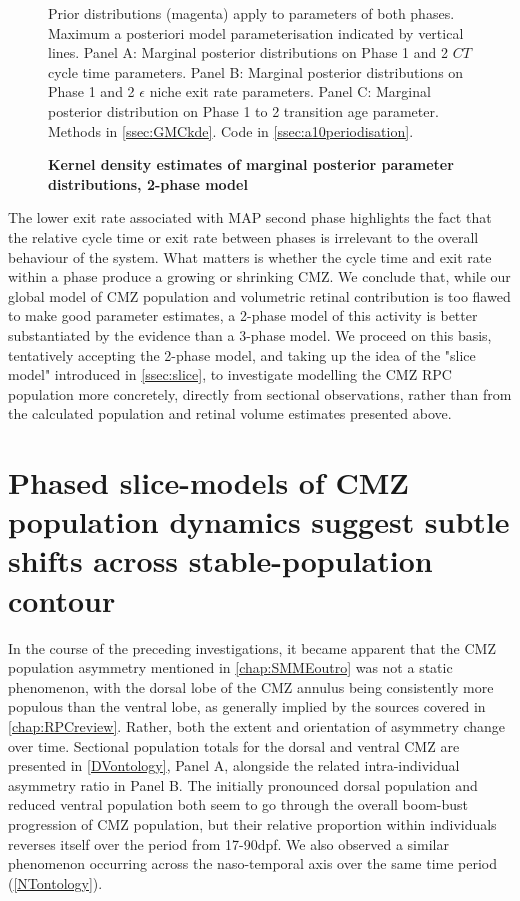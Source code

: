 \begin{figure}[!h]
    \caption{{\bf Kernel density estimates of marginal posterior parameter distributions, 2-phase model}}
    Prior distributions (magenta) apply to parameters of both phases. Maximum a posteriori model parameterisation indicated by vertical lines.
    Panel A: Marginal posterior distributions on Phase 1 and 2 $CT$ cycle time parameters. 
    Panel B: Marginal posterior distributions on Phase 1 and 2 $\epsilon$ niche exit rate parameters.
    Panel C: Marginal posterior distribution on Phase 1 to 2 transition age parameter.
    \label{phasemarginals}
    Methods in \autoref{ssec:GMCkde}.
    Code in \autoref{ssec:a10periodisation}.    
\end{figure}

The lower exit rate associated with MAP second phase highlights the fact that the relative cycle time or exit rate between phases is irrelevant to the overall behaviour of the system. What matters is whether the cycle time and exit rate within a phase produce a growing or shrinking CMZ. We conclude that, while our global model of CMZ population and volumetric retinal contribution is too flawed to make good parameter estimates, a 2-phase model of this activity is better substantiated by the evidence than a 3-phase model. We proceed on this basis, tentatively accepting the 2-phase model, and taking up the idea of the "slice model" introduced in \autoref{ssec:slice}, to investigate modelling the CMZ RPC population more concretely, directly from sectional observations, rather than from the calculated population and retinal volume estimates presented above.

\FloatBarrier

\section{Phased slice-models of CMZ population dynamics suggest subtle shifts across stable-population contour}
\label{sec:sliceGMC}

In the course of the preceding investigations, it became apparent that the CMZ population asymmetry mentioned in \autoref{chap:SMMEoutro} was not a static phenomenon, with the dorsal lobe of the CMZ annulus being consistently more populous than the ventral lobe, as generally implied by the sources covered in \autoref{chap:RPCreview}. Rather, both the extent and orientation of asymmetry change over time. Sectional population totals for the dorsal and ventral CMZ are presented in \autoref{DVontology}, Panel A, alongside the related intra-individual asymmetry ratio in Panel B. The initially pronounced dorsal population and reduced ventral population both seem to go through the overall boom-bust progression of CMZ population, but their relative proportion within individuals reverses itself over the period from 17-90dpf. We also observed a similar phenomenon occurring across the naso-temporal axis over the same time period (\autoref{NTontology}).

